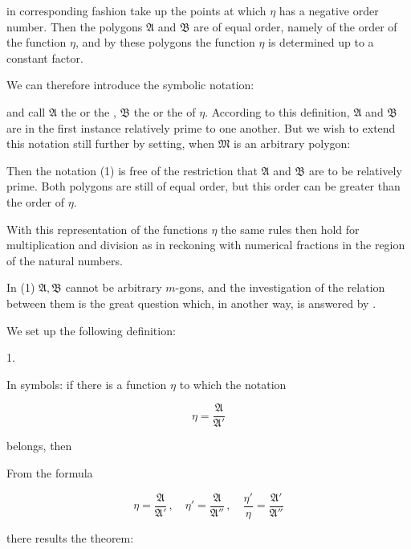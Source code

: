 in corresponding fashion take up the points at which $\eta$ has a negative order number. Then the polygons $\mathfrak{A}$ and $\mathfrak{B}$ are of equal order, namely of the order of the function $\eta$, and by these polygons the function $\eta$ is determined up to a constant factor.

We can therefore introduce the symbolic notation:


and call $\mathfrak{A}$ the  or the , $\mathfrak{B}$ the  or the  of $\eta$. According to this definition, $\mathfrak{A}$ and $\mathfrak{B}$ are in the first instance relatively prime to one another. But we wish to extend this notation still further by setting, when $\mathfrak{M}$ is an arbitrary polygon:


Then the notation (1) is free of the restriction that $\mathfrak{A}$ and $\mathfrak{B}$ are to be relatively prime. Both polygons are still of equal order, but this order can be greater than the order of $\eta$.

With this representation of the functions $\eta$ the same rules then hold for multiplication and division as in reckoning with numerical fractions in the region of the natural numbers.

In (1) $\mathfrak{A}, \mathfrak{B}$ cannot be arbitrary $m$-gons, and the investigation of the relation between them is the great question which, in another way, is answered by .

We set up the following definition:

1. 

In symbols: if there is a function $\eta$ to which the notation

\[
\eta = \dfrac{\mathfrak{A}}{\mathfrak{A}'}
\]

belongs, then


From the formula

\[
\eta = \dfrac{\mathfrak{A}}{\mathfrak{A}'}\,, \quad \eta' = \dfrac{\mathfrak{A}}{\mathfrak{A}''}\,, \quad \dfrac{\eta'}{\eta} = \dfrac{\mathfrak{A}'}{\mathfrak{A}''}
\]

there results the theorem:

